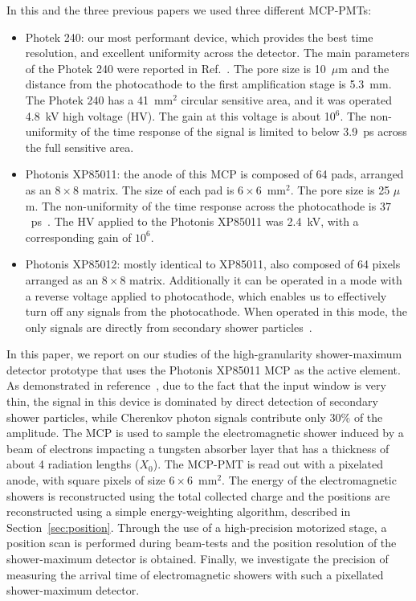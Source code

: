 In this and the three previous papers we used three different MCP-PMTs:
\begin{itemize}
\item Photek 240: our most performant device, which provides the best
      time resolution, and excellent uniformity across the detector. The main parameters
      of the Photek 240 were reported in Ref.~\cite{MCPFastCaloNIMA}. The pore
      size is 10~$\mu$m and the distance from the photocathode to the first
      amplification stage is 5.3~mm. The Photek 240 has a 41~mm$^2$ circular
      sensitive area, and it was operated 4.8~kV high voltage (HV). The gain at
      this voltage is about 10$^6$. The non-uniformity of the time response of the signal 
      is limited to below 3.9~ps across the full sensitive area.
\item Photonis XP85011: the anode of this MCP is composed of 64 pads, arranged
      as an $8\times8$ matrix. The size of each pad is $6\times6$~$\mathrm{mm}^{2}$. 
      The pore size is 25 $\mu$m. The non-uniformity  of the time response across the photocathode
      is $37$~ps~\cite{MCPFastCaloNIMA, Ronzhin2015288}. The HV applied to the Photonis XP85011 
      was 2.4~kV, with a corresponding gain of $10^6$. 
\item Photonis XP85012: mostly identical to XP85011, also composed of 64 pixels arranged as
      an $8\times8$ matrix. Additionally it can be operated in a mode with a reverse voltage applied 
      to photocathode, which enables us to effectively turn off any signals from 
      the photocathode. When operated in this mode, the only signals are 
      directly from secondary shower particles~\cite{Ronzhin:2015pba}.  
\end{itemize}

In this paper, we report on our studies of the high-granularity shower-maximum detector prototype 
that uses the Photonis XP85011 MCP as the active element. As demonstrated in 
reference~\cite{MCPFastCaloNIMA}, due to the fact that the input window is very thin, the signal in 
this device is dominated by direct detection of secondary shower particles, 
while Cherenkov photon signals contribute only $30\%$ of the amplitude.
The MCP is used to sample the electromagnetic shower induced by a beam of electrons impacting a 
tungsten absorber layer that has a thickness of about 4 radiation lengths ($X_{0}$). The
MCP-PMT is read out with a pixelated anode, with square pixels of size 
$6\times6$~$\mathrm{mm}^{2}$. The energy of the electromagnetic showers is reconstructed 
using the total collected charge and the positions are reconstructed using a simple
energy-weighting algorithm, described in Section~\ref{sec:position}.
Through the use of a high-precision motorized stage, a position scan is
performed during beam-tests and the position resolution of the shower-maximum
detector is obtained. Finally, we investigate the precision of measuring the
arrival time of electromagnetic showers with such a pixellated shower-maximum
detector.

